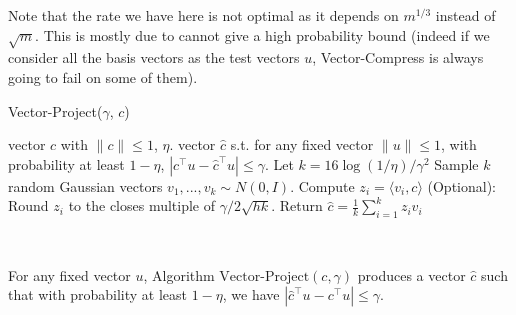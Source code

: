 Note that the rate we have here is not optimal as it depends on $m^{1/3}$ instead of $\sqrt{m}$. This is mostly due to cannot give a high probability bound (indeed if we consider all the basis vectors as the test vectors $u$, Vector-Compress is always going to fail on some of them). 

\fi

\begin{algorithm}
\caption{Vector-Project($\gamma$, $c$)}
\begin{algorithmic}
\REQUIRE vector $c$ with $\|c\| \le 1$, $\eta$.
\ENSURE vector $\hat{c}$ s.t. for any fixed vector $\|u\| \le 1$, with probability at least $1-\eta$, $|c^\top u - \hat{c}^\top u| \le \gamma$. 
\STATE Let $k = 16\log(1/\eta)/\gamma^2$
\STATE Sample $k$ random Gaussian vectors $v_1,...,v_k\sim N(0,I)$.
\STATE Compute $z_i = \langle v_i,c\rangle$
\STATE (Optional): Round $z_i$ to the closes multiple of $\gamma/2\sqrt{hk}$.
\STATE Return $\hat{c} = \frac{1}{k}\sum_{i=1}^k z_i v_i$
\end{algorithmic}
\label{alg:vec-proj}
\end{algorithm}

\ 

\begin{lemma} For any fixed vector $u$, Algorithm $\mbox{Vector-Project}(c, \gamma)$ produces a vector $\hat{c}$ such that with probability at least $1-\eta$, we have $|\hat{c}^\top u - c^\top u| \le \gamma$.

\end{lemma}

\ 

